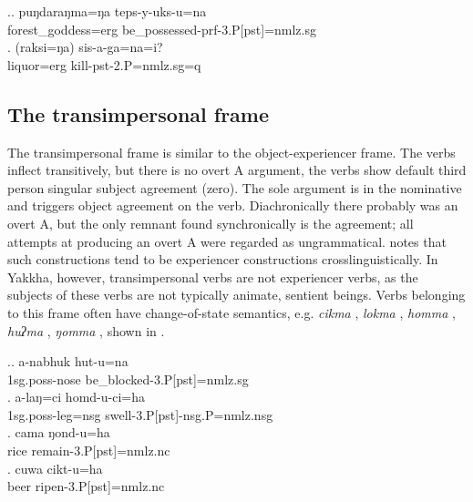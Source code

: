 \ex.\ag. puŋdaraŋma=ŋa  teps-y-uks-u=na\\
forest\_goddess{\sc =erg} be\_possessed{\sc -prf-3.P[pst]=nmlz.sg}\\
\bg. (raksi=ŋa)  sis-a-ga=na=i? \\
		liquor{\sc =erg} kill{\sc -pst-2.P=nmlz.sg=q}\\


 
\subsection{The transimpersonal frame}\label{tr-imp}


\noindent
The transimpersonal frame  is similar to the object-experiencer frame. The verbs inflect transitively, but there is no overt A argument, the verbs show default third person singular subject agreement (zero). The sole argument is in the nominative and triggers  object agreement on the verb. Diachronically there probably was  an overt A, but the only remnant found synchronically is the agreement; all attempts at producing an overt A were regarded as ungrammatical. \citet{Malchukov2008Split} notes that such constructions tend to be experiencer constructions crosslinguistically. In Yakkha, however, transimpersonal verbs are not experiencer verbs, as the subjects of these verbs are not typically animate, sentient beings. Verbs belonging to this frame often have change-of-state semantics, e.g. \emph{cikma} , \emph{lokma} , \emph{homma} , \emph{huʔma} , \emph{ŋomma} , shown in \Next. 
 
\ex.\ag. a-nabhuk hut-u=na\\
 {\sc 1sg.poss-}nose be\_blocked{\sc -3.P[pst]=nmlz.sg} \\
\bg. a-laŋ=ci homd-u-ci=ha\\
 {\sc 1sg.poss-}leg{\sc =nsg} swell{\sc -3.P[pst]-nsg.P=nmlz.nsg} \\
 \bg. cama ŋond-u=ha\\
rice remain{\sc -3.P[pst]=nmlz.nc}\\
\bg. cuwa cikt-u=ha\\
beer ripen{\sc -3.P[pst]=nmlz.nc}\\
 
